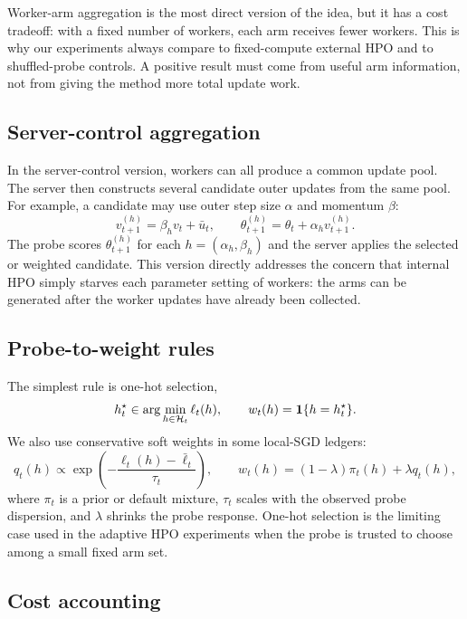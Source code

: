 Worker-arm aggregation is the most direct version of the idea, but it has a
cost tradeoff: with a fixed number of workers, each arm receives fewer workers.
This is why our experiments always compare to fixed-compute external HPO and
to shuffled-probe controls. A positive result must come from useful arm
information, not from giving the method more total update work.

\subsection{Server-control aggregation}

In the server-control version, workers can all produce a common update pool.
The server then constructs several candidate outer updates from the same pool.
For example, a candidate may use outer step size $\alpha$ and momentum
$\beta$:
\begin{equation}
v_{t+1}^{(h)} = \beta_h v_t + \bar{u}_t,\qquad
\theta_{t+1}^{(h)} = \theta_t + \alpha_h v_{t+1}^{(h)}.
\end{equation}
The probe scores $\theta_{t+1}^{(h)}$ for each $h=(\alpha_h,\beta_h)$ and the
server applies the selected or weighted candidate. This version directly
addresses the concern that internal HPO simply starves each parameter setting
of workers: the arms can be generated after the worker updates have already
been collected.

\subsection{Probe-to-weight rules}

The simplest rule is one-hot selection,
\begin{equation}
h_t^\star \in \arg\min_{h \in \mathcal{H}_t} \ell_t(h),\qquad
w_t(h)=\mathbf{1}\{h=h_t^\star\}.
\end{equation}
We also use conservative soft weights in some local-SGD ledgers:
\begin{equation}
q_t(h) \propto \exp\left(-\frac{\ell_t(h)-\bar{\ell}_t}{\tau_t}\right),
\qquad
w_t(h) = (1-\lambda)\pi_t(h) + \lambda q_t(h),
\end{equation}
where $\pi_t$ is a prior or default mixture, $\tau_t$ scales with the observed
probe dispersion, and $\lambda$ shrinks the probe response. One-hot selection
is the limiting case used in the adaptive HPO experiments when the probe is
trusted to choose among a small fixed arm set.

\subsection{Cost accounting}

